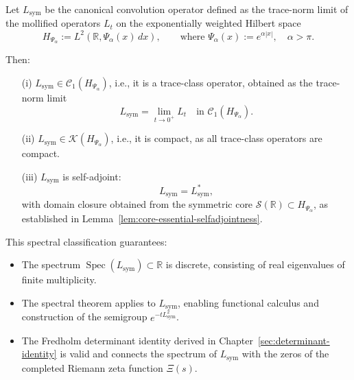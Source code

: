 \begin{theorem}
\label{thm:sa-trace-class-Lsym}
Let \( L_{\mathrm{sym}} \) be the canonical convolution operator defined as the trace-norm limit of the mollified operators \( L_t \) on the exponentially weighted Hilbert space
\[
H_{\Psi_\alpha} := L^2(\mathbb{R}, \Psi_\alpha(x)\, dx), \qquad \text{where } \Psi_\alpha(x) := e^{\alpha |x|}, \quad \alpha > \pi.
\]

Then:
\begin{enumerate}
  \item[\textnormal{(i)}] \( L_{\mathrm{sym}} \in \mathcal{C}_1(H_{\Psi_\alpha}) \), i.e., it is a trace-class operator, obtained as the trace-norm limit
  \[
  L_{\mathrm{sym}} = \lim_{t \to 0^+} L_t \quad \text{in } \mathcal{C}_1(H_{\Psi_\alpha}).
  \]

  \item[\textnormal{(ii)}] \( L_{\mathrm{sym}} \in \mathcal{K}(H_{\Psi_\alpha}) \), i.e., it is compact, as all trace-class operators are compact.

  \item[\textnormal{(iii)}] \( L_{\mathrm{sym}} \) is self-adjoint:
  \[
  L_{\mathrm{sym}} = L_{\mathrm{sym}}^*,
  \]
  with domain closure obtained from the symmetric core \( \mathcal{S}(\mathbb{R}) \subset H_{\Psi_\alpha} \), as established in Lemma~\ref{lem:core-essential-selfadjointness}.
\end{enumerate}

\medskip

\noindent
This spectral classification guarantees:
\begin{itemize}
  \item The spectrum \( \operatorname{Spec}(L_{\mathrm{sym}}) \subset \mathbb{R} \) is discrete, consisting of real eigenvalues of finite multiplicity.
  \item The spectral theorem applies to \( L_{\mathrm{sym}} \), enabling functional calculus and construction of the semigroup \( e^{-tL_{\mathrm{sym}}^2} \).
  \item The Fredholm determinant identity derived in Chapter~\ref{sec:determinant-identity} is valid and connects the spectrum of \( L_{\mathrm{sym}} \) with the zeros of the completed Riemann zeta function \( \Xi(s) \).
\end{itemize}
\end{theorem}
% 